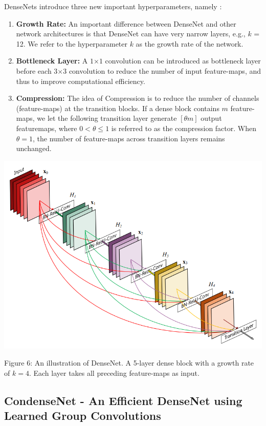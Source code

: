 \documentclass[conference]{IEEEtran}
\begin{document}
DenseNets introduce three new important hyperparameters, namely \cite{10}:
\begin{enumerate}
    \item \textbf{Growth Rate:} An important difference between DenseNet and other network architectures is that DenseNet can have very narrow layers, e.g., $k$ = 12. We refer to the hyperparameter $k$ as the growth rate of the network.
    \item \textbf{Bottleneck Layer:} A $1$×$1$ convolution can be introduced as bottleneck layer before each $3$×$3$ convolution to reduce the number of input feature-maps, and thus to improve computational efficiency.
    \item \textbf{Compression:} The idea of Compression is to reduce the number of channels (feature-maps) at the transition blocks. If a dense block contains $m$ feature-maps, we let the following transition layer generate $[\theta m]$ output featuremaps, where $0 <\theta \leq1$ is referred to as the compression factor. When $\theta = 1$, the number of feature-maps across transition layers remains unchanged.
\end{enumerate}

\begin{center}
    \includegraphics[scale=0.32]{DenseNEt.PNG}\\
\end{center}
Figure 6: An illustration of DenseNet. A 5-layer dense block with a growth rate of $k = 4$. Each layer takes all preceding feature-maps as input. \cite{10}

\subsection{\textbf{CondenseNet - An Efficient DenseNet using Learned Group Convolutions}}
\end{document}
